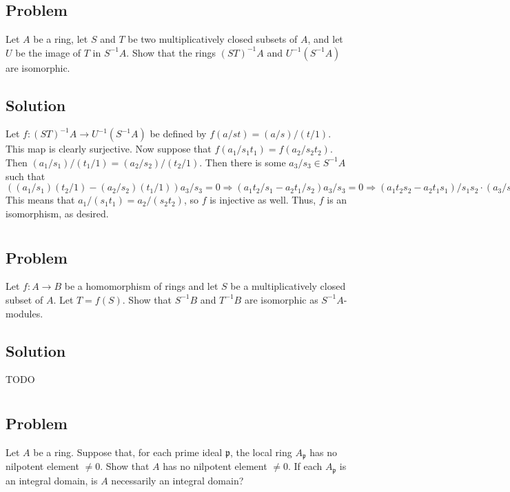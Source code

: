 \documentclass[book,12pt,oneside,openany]{memoir}
\begin{document}
\section{}
\subsection{Problem}
Let $A$ be a ring, let $S$ and $T$ be two multiplicatively closed subsets of $A$, and let $U$ be the image of $T$ in $S^{-1}A$. Show that the rings $(ST)^{-1}A$ and $U^{-1}(S^{-1}A)$ are isomorphic.

\subsection{Solution}
Let $f: (ST)^{-1}A \rightarrow U^{-1}(S^{-1}A)$ be defined by $f(a/st) = (a/s)/(t/1)$. This map is clearly surjective. Now suppose that $f(a_1/s_1t_1) = f(a_2/s_2t_2)$. Then $(a_1/s_1)/(t_1/1) = (a_2/s_2)/(t_2/1)$. Then there is some $a_3/s_3 \in S^{-1}A$ such that $((a_1/s_1)(t_2/1) - (a_2/s_2)(t_1/1))a_3/s_3 = 0 \Rightarrow (a_1 t_2/s_1 - a_2 t_1/s_2)a_3/s_3 = 0 \Rightarrow (a_1t_2s_2 - a_2 t_1s_1)/s_1 s_2 \cdot (a_3/s_3) = 0 \Rightarrow a_1t_2s_2a_3 - a_2 t_1 s_1 a_3 = 0 $ This means that $a_1/(s_1t_1) = a_2/(s_2t_2)$, so $f$ is injective as well. Thus, $f$ is an isomorphism, as desired.

\section{}
\subsection{Problem}
Let $f: A \rightarrow B$ be a homomorphism of rings and let $S$ be a multiplicatively closed subset of $A$. Let $T = f(S)$. Show that $S^{-1}B$ and $T^{-1}B$ are isomorphic as $S^{-1}A$-modules.

\subsection{Solution}
TODO
\section{}
\subsection{Problem}
Let $A$ be a ring. Suppose that, for each prime ideal $\mathfrak{p}$, the local ring $A_{\mathfrak{p}}$ has no nilpotent element $\neq 0$. Show that $A$ has no nilpotent element $\neq 0$. If each $A_{\mathfrak{p}}$ is an integral domain, is $A$ necessarily an integral domain?
\end{document}
